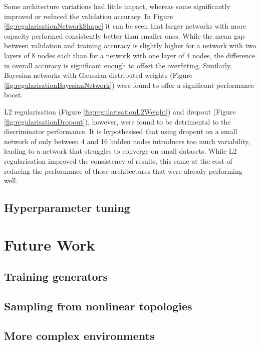 \documentclass[a4paper]{article}
\begin{document}
Some architecture variations had little impact, whereas some significantly improved or reduced the validation accuracy.
In Figure \ref{fig:regularisationNetworkShape} it can be seen that larger networks with more capacity performed consistently better than smaller ones.
While the mean gap between validation and training accuracy is slightly higher for a network with two layers of 8 nodes each than for a network
with one layer of 4 nodes, the difference in overall accuracy is significant enough to offset the overfitting.
Similarly, Bayesian networks with Gaussian distributed weights (Figure \ref{fig:regularisationBayesianNetwork}) were found to offer a significant performance boost.

L2 regularisation (Figure \ref{fig:regularisationL2Weight}) and dropout (Figure \ref{fig:regularisationDropout}), however, were
found to be detrimental to the discriminator performance.
It is hypothesised that using dropout on a small network of only between 4 and 16 hidden nodes introduces
too much variability, leading to a network that struggles to converge on small datasets.
While L2 regularisation improved the consistency of results, this came at the cost of reducing the performance
of those architectures that were already performing well.

\subsection{Hyperparameter tuning}

\section{Future Work}

\subsection{Training generators}

\subsection{Sampling from nonlinear topologies}

\subsection{More complex environments}
\end{document}
